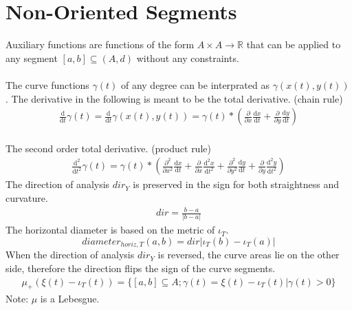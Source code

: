 \documentclass{report}
\begin{document}
\section{Non-Oriented Segments}
Auxiliary functions are functions of the form $A \times A \rightarrow \mathbb{R}$ that can be applied to any segment $[a,b] \subseteq (A,d)$ without any constraints.\\\\
The curve functions $ \gamma (t)$ of any degree can be interprated as $\gamma(x(t),y(t))$. The derivative in the following is meant to be the total derivative. (chain rule)
\begin{align}
\frac{\mathrm{d}}{\mathrm{d} t} \gamma (t) = \frac{\mathrm{d}}{\mathrm{d} t} \gamma (x(t),y(t)) = \gamma(t)* (\frac{\partial}{\partial x}  \frac{\mathrm{d} x}{\mathrm{d}t} + \frac{\partial}{\partial y} \frac{\mathrm{d} y}{\mathrm{d}t})
\end{align}\\
The second order total derivative. (product rule)
\begin{align}
\frac{\mathrm{d}^2}{\mathrm{d}t^2}\gamma(t)= \gamma(t)* (\frac{\partial^2}{\partial x^2}\frac{\mathrm{d}x}{\mathrm{d}t} + \frac{\partial}{\partial x}\frac{\mathrm{d}^2x}{\mathrm{d}t^2} + \frac{\partial^2}{\partial y^2}\frac{\mathrm{d}y}{\mathrm{d}t} + \frac{\partial}{\partial y}\frac{\mathrm{d}^2y}{\mathrm{d}t^2})
\end{align}
The direction of analysis $dir_{Y}$ is preserved in the sign for both straightness and curvature.
\begin{align}
dir = \frac{b-a}{\lvert b-a \rvert}
\end{align}
The horizontal diameter is based on the metric of $\iota_{T}$.
\begin{equation}
diameter_{horiz,T}(a,b)= dir \lvert \iota_{T}(b) - \iota_{T}(a) \rvert
\end{equation}
When the direction of analysis $dir_{Y}$ is reversed, the curve areas lie on the other side, therefore the direction flips the sign of the curve segments.
\begin{align}
\mu_{+}(\xi(t) -\iota_{T}(t))=\{[a,b] \subseteq A; \gamma(t)=\xi(t) -\iota_{T}(t) \vert \gamma(t)>0\}
\end{align}
Note: $\mu$ is a Lebesgue.
\end{document}
